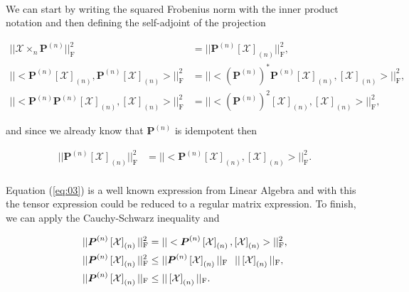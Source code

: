 \documentclass[a4paper,10pt]{article}
\begin{document}
\begin{enumerate}
\begin{enumerate}
            \paragraph{}We can start by writing the squared Frobenius norm with the inner product notation and then defining the self-adjoint of the projection
            
            \begin{align}
                || \mathcal{X} \times_{n} \boldsymbol{P}^{(n)} ||^{2}_{\text{F}} &= || \boldsymbol{P}^{(n)} \left[\mathcal{X}\right]_{(n)} ||^{2}_{\text{F}} , \\ || <\boldsymbol{P}^{(n)} \left[\mathcal{X}\right]_{(n)}, \boldsymbol{P}^{(n)} \left[\mathcal{X}\right]_{(n)}>||^{2}_{\text{F}} &= || < \left( \boldsymbol{P}^{(n)} \right)^{*} \boldsymbol{P}^{(n)} \left[\mathcal{X}\right]_{(n)}, \left[\mathcal{X}\right]_{(n)}>||^{2}_{\text{F}}, \\
                || < \boldsymbol{P}^{(n)} \boldsymbol{P}^{(n)} \left[\mathcal{X}\right]_{(n)}, \left[\mathcal{X}\right]_{(n)}>||^{2}_{\text{F}} &= || < \left( \boldsymbol{P}^{(n)} \right)^{2} \left[\mathcal{X}\right]_{(n)}, \left[\mathcal{X}\right]_{(n)}>||^{2}_{\text{F}},
            \end{align}
            
            and since we already know that $\boldsymbol{P}^{(n)}$ is idempotent then
            
            \begin{align}
                || \boldsymbol{P}^{(n)} \left[\mathcal{X}\right]_{(n)} ||^{2}_{\text{F}} &= || < \boldsymbol{P}^{(n)} \left[\mathcal{X}\right]_{(n)}, \left[\mathcal{X}\right]_{(n)}>||^{2}_{\text{F}}. \label{eq:03}
            \end{align}
            
            \paragraph{}Equation (\ref{eq:03}) is a well known expression from Linear Algebra and with this the tensor expression could be reduced to a regular matrix expression. To finish, we can apply the Cauchy-Schwarz inequality and
            
            \begin{align}
                || \boldsymbol{P}^{(n)} \left[\mathcal{X}\right]_{(n)} ||^{2}_{\text{F}} &= || < \boldsymbol{P}^{(n)} \left[\mathcal{X}\right]_{(n)}, \left[\mathcal{X}\right]_{(n)}>||^{2}_{\text{F}}, \\
                || \boldsymbol{P}^{(n)} \left[\mathcal{X}\right]_{(n)} ||^{2}_{\text{F}} &\leq || \boldsymbol{P}^{(n)} \left[\mathcal{X}\right]_{(n)}||_{\text{F}} \hspace{.25cm} || \left[\mathcal{X}\right]_{(n)} ||_{\text{F}} , \\
                || \boldsymbol{P}^{(n)} \left[\mathcal{X}\right]_{(n)} ||_{\text{F}} &\leq || \left[\mathcal{X}\right]_{(n)} ||_{\text{F}}.
            \end{align}
            

\end{enumerate}
\end{enumerate}
\end{document}
